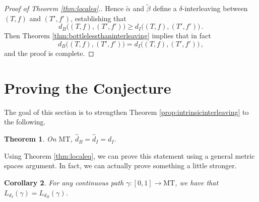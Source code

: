\documentclass{article}
\newtheorem{theorem}{Theorem}
\newtheorem{corollary}[theorem]{Corollary}
\theoremstyle{definition}
\newcommand{\MT}{\mathrm{MT}}
\begin{document}
\begin{proof}[Proof of Theorem \ref{thm:localeq}.]
Hence $\widetilde\alpha$ and $\widetilde\beta$ define a $\delta$-interleaving between $(T,f)$ and $(T',f')$, establishing that
\begin{equation*}
    d_B\big((T,f),(T',f')\big) \geq d_I\big((T,f),(T',f')\big)\,.
\end{equation*}
Then Theorem \ref{thm:bottlelessthaninterleaving} implies that in fact
\begin{equation*}
    d_B\big((T,f),(T',f')\big) = d_I\big((T,f),(T',f')\big)\,,
\end{equation*}
and the proof is complete.
\end{proof}

\section{Proving the Conjecture}
\label{sec:intrinicint}

The goal of this section is to strengthen Theorem \ref{prop:intrinsicinterleaving} to the following.

\begin{theorem}
    \label{thm:conjecture}
    On $\MT$, $\widehat{d}_B = \widehat{d}_I = d_I$.
\end{theorem}

Using Theorem \ref{thm:localeq}, we can prove this statement using a general metric spaces argument. In fact, we can actually prove something a little stronger.

\begin{corollary}
    \label{cor:pathssame}
    For any continuous path $\gamma:[0,1] \to \MT$, we have that $L_{d_I}(\gamma) = L_{d_B}(\gamma)$.
\end{corollary}
\end{document}
